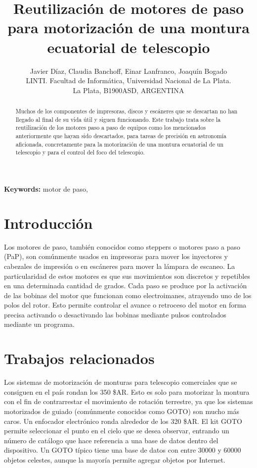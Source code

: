 \documentclass[final,narroweqnarray,inline,twoside]{ieee}
\author{Javier Díaz, Claudia Banchoff, Einar Lanfranco, Joaquín Bogado
\\LINTI. Facultad de Informática, Universidad Nacional de La Plata.
\\La Plata, B1900ASD, ARGENTINA
}
\title{Reutilización de motores de paso para motorización de una montura ecuatorial de telescopio}
\begin{document}
\maketitle
\sloppy

\begin{abstract}
Muchos de los componentes de impresoras, discos y escáneres que se descartan no han llegado al final de su vida útil y
siguen funcionando.
Este trabajo trata sobre la reutilización de los motores paso a paso de equipos como los mencionados anteriormente que hayan
sido descartados, para tareas de precisión en astronomía aficionada, concretamente para la motorización de una montura
ecuatorial de un telescopio y para el control del foco del telescopio.
\end{abstract}

\noindent \textbf{Keywords: } motor de paso, 

\section{Introducción}
Los motores de paso, también conocidos como steppers o motores paso a paso (PaP), son comúnmente usados en impresoras para
mover los inyectores y cabezales de impresión o en escáneres para mover la lámpara de escaneo. La particularidad de estos
motores es que sus movimientos son discretos y repetibles en una determinada cantidad de grados. Cada paso se produce por la
activación de las bobinas del motor que funcionan como electroimanes, atrayendo uno de los polos del rotor. Esto permite
controlar el avance o retroceso del motor en forma precisa activando o desactivando las bobinas mediante pulsos controlados
mediante un programa.
\section{Trabajos relacionados}
Los sistemas de motorización de monturas para telescopio comerciales que se consiguen en el país rondan los 350 \$AR. Esto
es solo para motorizar la montura con el fin de contrarrestar el movimiento de rotación terrestre, ya que los sistemas
motorizados de guiado (comúnmente conocidos como GOTO) son mucho más caros. Un enfocador electrónico ronda alrededor de los
320 \$AR. El kit GOTO permite seleccionar el punto en el cielo que se desea observar, entrando un número de catálogo que hace
referencia a una base de datos dentro del dispositivo. Un GOTO típico tiene una base de datos con entre 30000 y 60000 objetos
celestes, aunque la mayoría permite agregar objetos por Internet.
\end{document}
